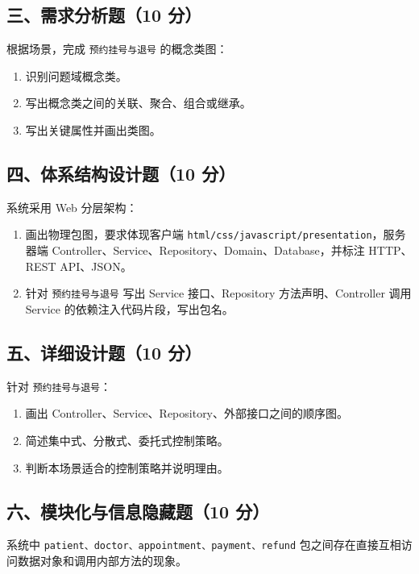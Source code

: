 \documentclass[UTF8,zihao=-4]{ctexart}
\begin{document}
\subsection{三、需求分析题（10 分）}


根据场景，完成 \texttt{预约挂号与退号} 的概念类图：


\begin{enumerate}
\item 识别问题域概念类。
\item 写出概念类之间的关联、聚合、组合或继承。
\item 写出关键属性并画出类图。
\end{enumerate}


\subsection{四、体系结构设计题（10 分）}


系统采用 Web 分层架构：


\begin{enumerate}
\item 画出物理包图，要求体现客户端 \texttt{html/css/javascript/presentation}，服务器端 Controller、Service、Repository、Domain、Database，并标注 HTTP、REST API、JSON。
\item 针对 \texttt{预约挂号与退号} 写出 Service 接口、Repository 方法声明、Controller 调用 Service 的依赖注入代码片段，写出包名。
\end{enumerate}


\subsection{五、详细设计题（10 分）}


针对 \texttt{预约挂号与退号}：


\begin{enumerate}
\item 画出 Controller、Service、Repository、外部接口之间的顺序图。
\item 简述集中式、分散式、委托式控制策略。
\item 判断本场景适合的控制策略并说明理由。
\end{enumerate}


\subsection{六、模块化与信息隐藏题（10 分）}


系统中 \texttt{patient、doctor、appointment、payment、refund} 包之间存在直接互相访问数据对象和调用内部方法的现象。
\end{document}
